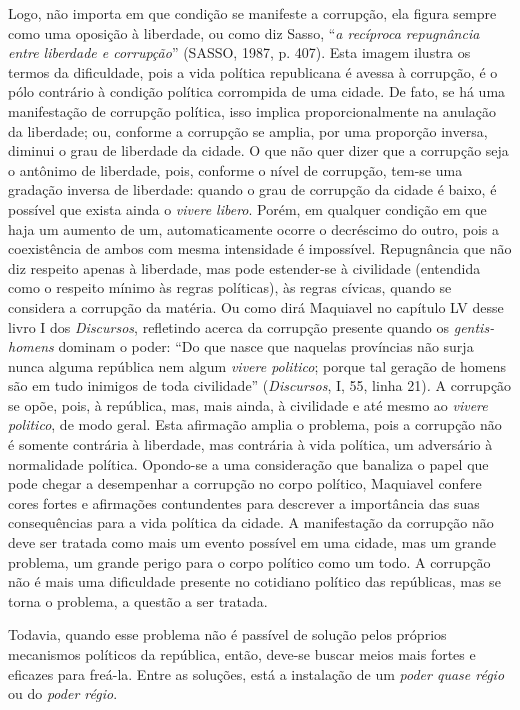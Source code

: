 Logo, não importa em que condição se manifeste a corrupção, ela figura
sempre como uma oposição à liberdade, ou como diz Sasso, ``\emph{a
recíproca repugnância entre liberdade e corrupção}'' (SASSO, 1987, p.
407). Esta imagem ilustra os termos da dificuldade, pois a vida política
republicana é avessa à corrupção, é o pólo contrário à condição política
corrompida de uma cidade. De fato, se há uma manifestação de corrupção
política, isso implica proporcionalmente na anulação da liberdade; ou,
conforme a corrupção se amplia, por uma proporção inversa, diminui o
grau de liberdade da cidade. O que não quer dizer que a corrupção seja o
antônimo de liberdade, pois, conforme o nível de corrupção, tem-se uma
gradação inversa de liberdade: quando o grau de corrupção da cidade é
baixo, é possível que exista ainda o \emph{vivere libero}. Porém, em
qualquer condição em que haja um aumento de um, automaticamente ocorre o
decréscimo do outro, pois a coexistência de ambos com mesma intensidade
é impossível. Repugnância que não diz respeito apenas à liberdade, mas
pode estender-se à civilidade (entendida como o respeito mínimo às
regras políticas), às regras cívicas, quando se considera a corrupção da
matéria. Ou como dirá Maquiavel no capítulo LV desse livro I dos
\emph{Discursos}, refletindo acerca da corrupção presente quando os
\emph{gentis-homens} dominam o poder: ``Do que nasce que naquelas
províncias não surja nunca alguma república nem algum \emph{vivere
politico}; porque tal geração de homens são em tudo inimigos de toda
civilidade'' (\emph{Discursos}, I, 55, linha 21)\emph{.} A corrupção se
opõe, pois, à república, mas, mais ainda, à civilidade e até mesmo ao
\emph{vivere politico}, de modo geral. Esta afirmação amplia o problema,
pois a corrupção não é somente contrária à liberdade, mas contrária à
vida política, um adversário à normalidade política. Opondo-se a uma
consideração que banaliza o papel que pode chegar a desempenhar a
corrupção no corpo político, Maquiavel confere cores fortes e afirmações
contundentes para descrever a importância das suas consequências para a
vida política da cidade. A manifestação da corrupção não deve ser
tratada como mais um evento possível em uma cidade, mas um grande
problema, um grande perigo para o corpo político como um todo. A
corrupção não é mais uma dificuldade presente no cotidiano político das
repúblicas, mas se torna o problema, a questão a ser tratada.

Todavia, quando esse problema não é passível de solução pelos próprios
mecanismos políticos da república, então, deve-se buscar meios mais
fortes e eficazes para freá-la. Entre as soluções, está a instalação de
um \emph{poder quase régio} ou do \emph{poder régio}.

